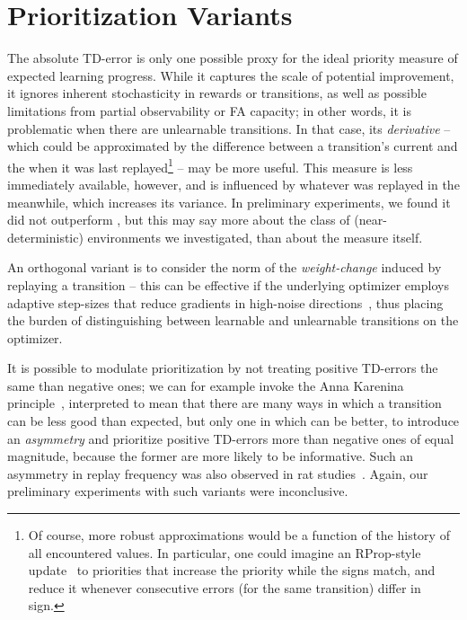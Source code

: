 \documentclass[a4paper]{article}
\begin{document}




\newpage

\appendix


\section{Prioritization Variants}
\label{sec-alternative-td}

The absolute TD-error is only one possible proxy for the ideal priority measure of expected learning progress.
While it captures the scale of potential improvement, it ignores inherent stochasticity in rewards or transitions, 
as well as possible limitations from partial observability or FA capacity; in other words, it is problematic
when there are unlearnable transitions. In that case, its \emph{derivative} -- which could be approximated by the difference between a transition's current  and the  when it was last replayed\footnote{Of course, more robust approximations would be a function of the history of all encountered  values. 
In particular, one could imagine an RProp-style update~\citep{rprop} to priorities that increase the priority while 
the signs match, and reduce it whenever consecutive errors (for the same transition) differ in sign.}
-- may be more useful. 
This measure is less immediately available, however, and is influenced by whatever was replayed in the meanwhile, which increases its variance. 
In preliminary experiments, we found it  did not outperform , but this may 
say more about the class of (near-deterministic) environments we investigated, than about the measure itself.

An orthogonal variant is to consider the norm of the \emph{weight-change} induced by replaying a transition -- this can be effective if
the underlying optimizer employs adaptive step-sizes that reduce gradients in high-noise directions~\citep{pesky,adam}, 
thus placing the burden of distinguishing between learnable and unlearnable transitions on the optimizer.


It is possible to modulate prioritization by not treating positive TD-errors the same than negative ones; we can for example invoke the
Anna Karenina principle~\citep{jdiamond-zebras}, interpreted to mean that there are many ways in which 
a transition can be less good than expected, but only one in which can be better, to introduce an \emph{asymmetry} and prioritize
positive TD-errors more than negative ones of equal magnitude, because the former are more likely to be informative.
Such an asymmetry in replay frequency was also observed in rat studies~\citep{dharsh4}.
Again, our preliminary experiments with such variants were inconclusive.
\end{document}
